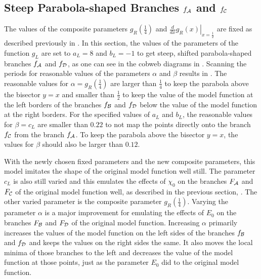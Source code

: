 \subsection{Steep Parabola-shaped Branches $f_{\mathcal{A}}$ and $f_{\mathcal{C}}$}
\label{sec:setup.quad.hyper.1}

The values of the composite parameters $g_R\left(\frac{1}{4}\right)$ and $\left. \frac{d}{dx} g_R\left(x\right) \right|_{x = \frac{1}{2}}$ are fixed as described previously in .
In this section, the values of the parameters of the function $g_L$ are set to $a_L = 8$ and $b_L = -1$ to get steep, shifted parabola-shaped branches $f_{\mathcal{A}}$ and $f_{\mathcal{D}}$, as one can see in the cobweb diagrams in .
Scanning the periods for reasonable values of the parameters $\alpha$ and $\beta$ results in .
The reasonable values for $\alpha = g_R\left(\frac{1}{4}\right)$ are larger than $\frac{1}{4}$ to keep the parabola above the bisector $y = x$ and smaller than $\frac{1}{2}$ to keep the value of the model function at the left borders of the branches $f_{\mathcal{B}}$ and $f_{\mathcal{D}}$ below the value of the model function at the right borders.
For the specified values of $a_L$ and $b_L$, the reasonable values for $\beta = c_L$ are smaller than $0.22$ to not map the points directly onto the branch $f_{\mathcal{C}}$ from the branch $f_{\mathcal{A}}$.
To keep the parabola above the bisector $y = x$, the values for $\beta$ should also be larger than $0.12$.

With the newly chosen fixed parameters and the new composite parameters, this model imitates the shape of the original model function well still.
The parameter $c_L$ is also still varied and this emulates the effects of $\chi_0$ on the branches $F_{\mathcal{A}}$ and $F_{\mathcal{C}}$ of the original model function well, as described in the previous section, .
The other varied parameter is the composite parameter $g_R\left(\frac{1}{4}\right)$.
Varying the parameter $\alpha$ is a major improvement for emulating the effects of $E_0$ on the branches $F_{\mathcal{B}}$ and $F_{\mathcal{D}}$ of the original model function.
Increasing $\alpha$ primarily increases the values of the model function on the left sides of the branches $f_{\mathcal{B}}$ and $f_{\mathcal{D}}$ and keeps the values on the right sides the same.
It also moves the local minima of those branches to the left and decreases the value of the model function at those points, just as the parameter $E_0$ did to the original model function.

